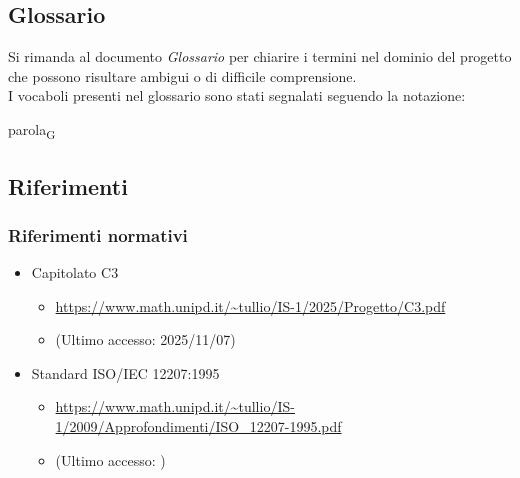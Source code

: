 \documentclass[a4paper,12pt]{article}
\begin{document}
    \subsection{Glossario}
        Si rimanda al documento \textit{Glossario} per chiarire i termini nel dominio del progetto che possono risultare ambigui o di difficile comprensione.\\
        I vocaboli presenti nel glossario sono stati segnalati seguendo la notazione:
        \begin{center}
            parola\textsubscript{G}
        \end{center}

    \subsection{Riferimenti}
        \subsubsection{Riferimenti normativi}
            \begin{itemize}
                \item Capitolato C3
                \begin{itemize}
                    \item {\url{https://www.math.unipd.it/~tullio/IS-1/2025/Progetto/C3.pdf}}
                    \item[] (Ultimo accesso: 2025/11/07)
                \end{itemize}
                \item Standard ISO/IEC 12207:1995
                \begin{itemize}
                    \item \url{https://www.math.unipd.it/~tullio/IS-1/2009/Approfondimenti/ISO_12207-1995.pdf}
                    \item[] (Ultimo accesso: )
                \end{itemize}
            \end{itemize}
\end{document}

